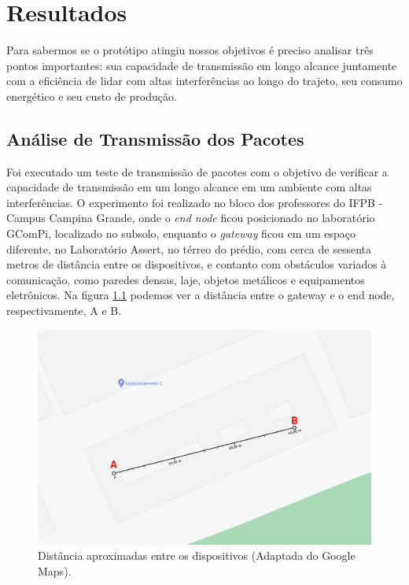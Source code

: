 \chapter{Resultados}
\label{cap:result}
Para sabermos se o protótipo atingiu nossos objetivos é preciso analisar três pontos importantes: sua capacidade de transmissão em longo alcance juntamente com a eficiência de lidar com altas interferências ao longo do trajeto, seu consumo energético e seu custo de produção.

\section{Análise de Transmissão dos Pacotes}
\label{result:transmissao}
Foi executado um teste de transmissão de pacotes com o objetivo de verificar a capacidade de transmissão em um longo alcance em um ambiente com altas interferências. O experimento foi realizado no bloco dos professores do IFPB - Campus Campina Grande, onde o \textit{end node} ficou posicionado no laboratório GComPi, localizado no subsolo, enquanto o \textit{gateway} ficou em um espaço diferente, no Laboratório Assert, no térreo do prédio, com cerca de sessenta metros de distância entre os dispositivos, e contanto com obstáculos variados à comunicação, como paredes densas, laje, objetos metálicos e equipamentos eletrônicos. Na figura \ref{fig:experiment-01} podemos ver a distância entre o gateway e o end node, respectivamente, A e B.

\begin{figure}[H]
  \centering
  \includegraphics[width=.80\textwidth]{assets/experiment-01.png} 
  \caption{Distância aproximadas entre os dispositivos (Adaptada do Google Maps).}
  \label{fig:experiment-01} 
\end{figure}

